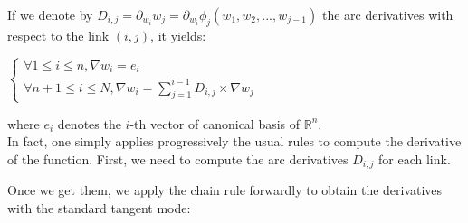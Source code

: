 \documentclass {article}
\begin{document}
			If we denote by $D_{i,j} = \partial_{w_{i}} w_{j} = \partial_{w_{i}} \phi_{j} (w_{1}, w_{2}, ..., w_{j-1})$ the arc 
			derivatives with respect to the link $(i, j)$, it yields:
			
			\begin{center}
				$\begin{cases} \forall 1  \leq i \leq n, \nabla w_{i} = e_{i}  \\ \forall n+1 \leq i \leq N, \nabla w_{i} = \displaystyle{\sum_{j=1}^{i-1} {D_{i,j} \times \nabla w_{j}}} \end{cases}$
			\end{center}

			where $e_{i}$ denotes the $i$-th vector of canonical basis of $\mathbb{R}^{n}$. \\
			In fact, one simply applies progressively the usual rules to compute the derivative of the function. 
			First, we need to compute the arc derivatives $D_{i,j}$ for each link. 

			\newpage 
			
			
			Once we get them, we apply the chain rule forwardly to obtain the derivatives with the standard tangent mode:
			
	
\end{document}
